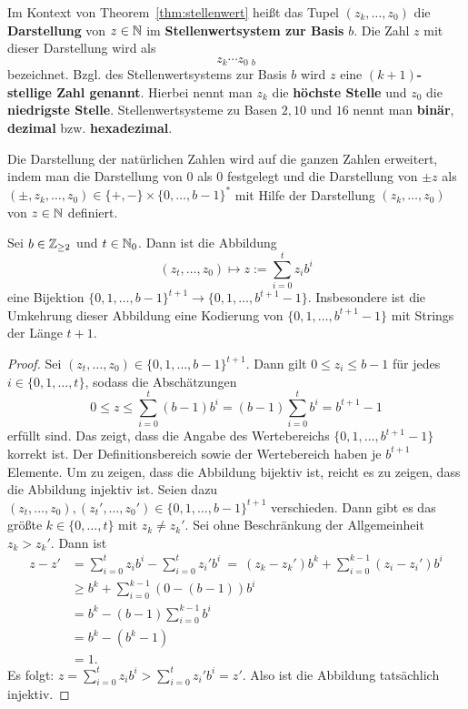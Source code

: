 \begin{defn}
	Im Kontext von Theorem~\ref{thm:stellenwert} heißt das Tupel $(z_k,\ldots,z_0)$ die \textbf{Darstellung} von $z \in \mathbb{N}$ im \textbf{Stellenwertsystem zur Basis} $b$. Die Zahl $z$ mit dieser Darstellung wird als 
	\[	
			z_k \cdots z_0 \ {}_{b}
	\]
	bezeichnet. Bzgl. des Stellenwertsystems zur Basis $b$ wird $z$ eine \textbf{$(k+1)$-stellige Zahl genannt}. Hierbei nennt man $z_k$ die \textbf{höchste Stelle} und $z_0$ die \textbf{niedrigste Stelle}.  Stellenwertsysteme zu Basen $2, 10$ und $16$ nennt man \textbf{binär}, \textbf{dezimal} bzw. \textbf{hexadezimal}. 
	
	Die Darstellung der natürlichen Zahlen wird auf die ganzen Zahlen erweitert, indem man die Darstellung von $0$ als $0$ festgelegt und die Darstellung von $\pm z$ als $(\pm ,z_k,\ldots,z_0) \in \{+,-\} \times \{0,\ldots,b-1\}^\ast$ mit Hilfe der Darstellung $(z_k,\ldots,z_0)$  von $z \in \mathbb{N}$ definiert. 
\end{defn} 

\begin{prop}
	Sei $b \in \mathbb{Z}_{\ge 2}$ und $t \in \mathbb{N}_0$. Dann ist die Abbildung 
	\begin{equation}
	(z_t,\ldots,z_0) \mapsto z:= \sum_{i=0}^t z_i b^i
	\end{equation}
	eine Bijektion $\{0,1,\ldots,b-1\}^{t+1} \to \{0,1,\ldots,b^{t+1} - 1\}$. Insbesondere ist die Umkehrung dieser Abbildung eine Kodierung von $\{0,1,\ldots,b^{t+1} -1\}$ mit Strings der Länge $t+1$.
\end{prop} 
\begin{proof}
 Sei $(z_t,\ldots,z_0) \in \{0,1,\ldots,b-1\}^{t+1}$. Dann gilt $0 \le z_i  \le b-1$ für jedes $i  \in \{0,1,\ldots,t\}$, sodass die Abschätzungen
 \[
 	0 \le z \le \sum_{i=0}^t (b-1) b^i = (b-1) \sum_{i=0}^t b^i = b^{t+1} -1
 \]
 erfüllt sind. Das zeigt, dass die Angabe des Wertebereichs $\{0,1,\ldots,b^{t+1} -1\}$ korrekt ist.
 Der Definitionsbereich sowie der Wertebereich haben je $b^{t+1}$ Elemente. Um zu zeigen, dass die Abbildung bijektiv ist, reicht es zu zeigen, dass die Abbildung injektiv ist. Seien dazu $(z_t,\ldots,z_0), (z_t',\ldots,z_0') \in \{0,1,\ldots,b-1\}^{t+1}$ verschieden. Dann gibt es das größte $k\in \{0,\ldots,t\}$ mit $z_k \ne z_k'$. Sei ohne Beschränkung der Allgemeinheit $z_k>z_k'$. Dann ist 
 \begin{align*}
 		z - z' &= \sum_{i=0}^t z_i b^i - \sum_{i=0}^t z_i' b^i \ = \ (z_k - z_k')b^k + \sum_{i=0}^{k-1} (z_i -z_i') b^i
 		\\ &\ge b^k + \sum_{i=0}^{k-1} (0 - (b-1)) b^i 
 		\\ &= b^k - (b-1) \sum_{i=0}^{k-1} b^i
 		\\ &= b^k - (b^k - 1) 
 		\\ &= 1.
 \end{align*}
Es folgt: $z = \sum_{i=0}^t z_i b^i > \sum_{i=0}^t z_i' b^i = z'$. Also ist die Abbildung tatsächlich injektiv. 
\end{proof} 

